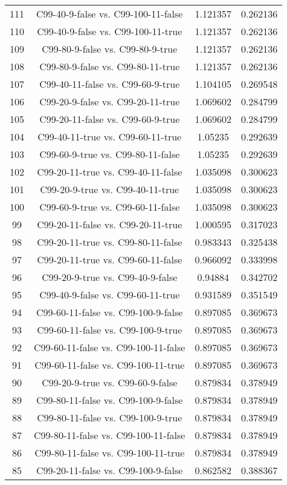\documentclass[a4paper,10pt]{article}
\begin{document}
\begin{landscape}
\begin{table}[!htp]
\begin{tabular}{cccc}
111&C99-40-9-false vs. C99-100-11-false&1.121357&0.262136\\
110&C99-40-9-false vs. C99-100-11-true&1.121357&0.262136\\
109&C99-80-9-false vs. C99-80-9-true&1.121357&0.262136\\
108&C99-80-9-false vs. C99-80-11-true&1.121357&0.262136\\
107&C99-40-11-false vs. C99-60-9-true&1.104105&0.269548\\
106&C99-20-9-false vs. C99-20-11-true&1.069602&0.284799\\
105&C99-20-11-false vs. C99-60-9-true&1.069602&0.284799\\
104&C99-40-11-true vs. C99-60-11-true&1.05235&0.292639\\
103&C99-60-9-true vs. C99-80-11-false&1.05235&0.292639\\
102&C99-20-11-true vs. C99-40-11-false&1.035098&0.300623\\
101&C99-20-9-true vs. C99-40-11-true&1.035098&0.300623\\
100&C99-60-9-true vs. C99-60-11-false&1.035098&0.300623\\
99&C99-20-11-false vs. C99-20-11-true&1.000595&0.317023\\
98&C99-20-11-true vs. C99-80-11-false&0.983343&0.325438\\
97&C99-20-11-true vs. C99-60-11-false&0.966092&0.333998\\
96&C99-20-9-true vs. C99-40-9-false&0.94884&0.342702\\
95&C99-40-9-false vs. C99-60-11-true&0.931589&0.351549\\
94&C99-60-11-false vs. C99-100-9-false&0.897085&0.369673\\
93&C99-60-11-false vs. C99-100-9-true&0.897085&0.369673\\
92&C99-60-11-false vs. C99-100-11-false&0.897085&0.369673\\
91&C99-60-11-false vs. C99-100-11-true&0.897085&0.369673\\
90&C99-20-9-true vs. C99-60-9-false&0.879834&0.378949\\
89&C99-80-11-false vs. C99-100-9-false&0.879834&0.378949\\
88&C99-80-11-false vs. C99-100-9-true&0.879834&0.378949\\
87&C99-80-11-false vs. C99-100-11-false&0.879834&0.378949\\
86&C99-80-11-false vs. C99-100-11-true&0.879834&0.378949\\
85&C99-20-11-false vs. C99-100-9-false&0.862582&0.388367\\

\end{tabular}
\end{table}
\end{landscape}
\end{document}
